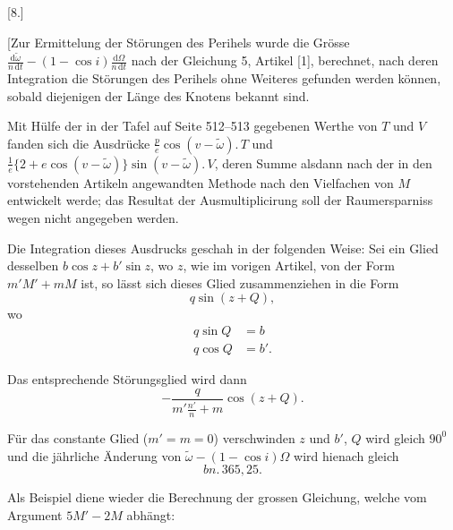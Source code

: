 \clearpage
\begin{landscape}
\begingroup
\fontsize{10}{13}\selectfont
{}
\renewcommand{\headrulewidth}{0pt}
\begin{center}[8.]\end{center}
\par\noindent\hspace*{\parindent}[Zur Ermittelung der Störungen des Perihels wurde die Grösse \(\frac{\mathrm{d}\tilde\omega}{n\,\mathrm{d}t}-(1-\cos i)\frac{\mathrm{d}\Omega}{n\,\mathrm{d}t}\) nach der Gleichung 5, Artikel [1], berechnet, nach deren Integration die Störungen des Perihels ohne Weiteres gefunden werden können, sobald diejenigen der Länge des Knotens bekannt sind.
\par\noindent\hspace*{\parindent}Mit Hülfe der in der Tafel auf Seite 512--513 gegebenen Werthe von \(T\) und \(V\) fanden sich die Ausdrücke \(\frac{p}{e}\cos(v-\tilde\omega)\mathord{.}\,T\) und \(\frac{1}{e}\{2+e\cos(v-\tilde\omega)\}\sin(v-\tilde\omega)\mathord{.}\,V\), deren Summe alsdann nach der in den vorstehenden Artikeln angewandten Methode nach den Vielfachen von \(M\) entwickelt werde; das Resultat der Ausmultiplicirung soll der Raumersparniss wegen nicht angegeben werden.
\par\noindent\hspace*{\parindent}Die Integration dieses Ausdrucks geschah in der folgenden Weise: Sei ein Glied desselben \(b\cos z+b'\sin z\), wo \(z\), wie im vorigen Artikel, von der Form \(m'M'+mM\) ist, so lässt sich dieses Glied zusammenziehen in die Form
\[
q\sin(z+Q),
\]
\noindent wo
\[
\begin{aligned}
q\sin Q&=b\\
q\cos Q&=b'.
\end{aligned}
\]
\par\noindent\hspace*{\parindent}Das entsprechende Störungsglied wird dann
\[
-\frac{q}{m'\frac{n'}{n}+m}\cos(z+Q).
\]
\par\noindent\hspace*{\parindent}Für das constante Glied (\(m'=m=0\)) verschwinden \(z\) und \(b'\), \(Q\) wird gleich \(90^0\) und die jährliche Änderung von \(\tilde\omega-(1-\cos i)\Omega\) wird hienach gleich
\[
bn\mathord{.}\,365{,}25.
\]
\par\noindent\hspace*{\parindent}Als Beispiel diene wieder die Berechnung der grossen Gleichung, welche vom Argument \(5M'-2M\) abhängt:

\end{landscape}
